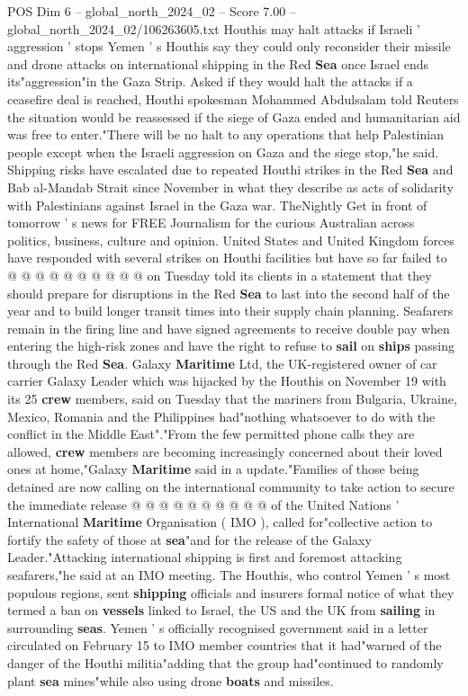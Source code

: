 \begin{textsample}{POS Dim 6 – global\_north\_2024\_02 – Score 7.00 – global\_north\_2024\_02/106263605.txt}  \label{ex:f6_pos_175}
Houthis may halt attacks if Israeli ' aggression ' stops Yemen ' s Houthis say they could only reconsider their missile and drone attacks on international shipping in the Red \textbf{Sea} once Israel ends its"aggression"in the Gaza Strip.
Asked if they would halt the attacks if a ceasefire deal is reached, Houthi spokesman Mohammed Abdulsalam told Reuters the situation would be reassessed if the siege of Gaza ended and humanitarian aid was free to enter."There will be no halt to any operations that help Palestinian people except when the Israeli aggression on Gaza and the siege stop,"he said.
Shipping risks have escalated due to repeated Houthi strikes in the Red \textbf{Sea} and Bab al-Mandab Strait since November in what they describe as acts of solidarity with Palestinians against Israel in the Gaza war.
TheNightly Get in front of tomorrow ' s news for FREE Journalism for the curious Australian across politics, business, culture and opinion.
United States and United Kingdom forces have responded with several strikes on Houthi facilities but have so far failed to @ @ @ @ @ @ @ @ @ @ on Tuesday told its clients in a statement that they should prepare for disruptions in the Red \textbf{Sea} to last into the second half of the year and to build longer transit times into their supply chain planning.
Seafarers remain in the firing line and have signed agreements to receive double pay when entering the high-risk zones and have the right to refuse to \textbf{sail} on \textbf{ships} passing through the Red \textbf{Sea}.
Galaxy \textbf{Maritime} Ltd, the UK-registered owner of car carrier Galaxy Leader which was hijacked by the Houthis on November 19 with its 25 \textbf{crew} members, said on Tuesday that the mariners from Bulgaria, Ukraine, Mexico, Romania and the Philippines had"nothing whatsoever to do with the conflict in the Middle East"."From the few permitted phone calls they are allowed, \textbf{crew} members are becoming increasingly concerned about their loved ones at home,"Galaxy \textbf{Maritime} said in a update."Families of those being detained are now calling on the international community to take action to secure the immediate release @ @ @ @ @ @ @ @ @ @ of the United Nations ' International \textbf{Maritime} Organisation ( IMO ), called for"collective action to fortify the safety of those at \textbf{sea}"and for the release of the Galaxy Leader."Attacking international shipping is first and foremost attacking seafarers,"he said at an IMO meeting.
The Houthis, who control Yemen ' s most populous regions, sent \textbf{shipping} officials and insurers formal notice of what they termed a ban on \textbf{vessels} linked to Israel, the US and the UK from \textbf{sailing} in surrounding \textbf{seas}.
Yemen ' s officially recognised government said in a letter circulated on February 15 to IMO member countries that it had"warned of the danger of the Houthi militia"adding that the group had"continued to randomly plant \textbf{sea} mines"while also using drone \textbf{boats} and missiles.

\end{textsample}
